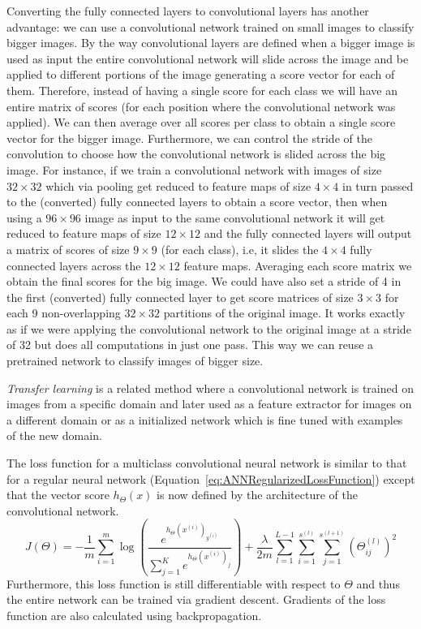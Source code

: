 Converting the fully connected layers to convolutional layers has another advantage: we can use a convolutional network trained on small images to classify bigger images. By the way convolutional layers are defined when a bigger image is used as input the entire convolutional network will slide across the image and be applied to different portions of the image generating a score vector for each of them. Therefore, instead of having a single score for each class we will have an entire matrix of scores (for each position where the convolutional network was applied). We can then average over all scores per class to obtain a single score vector for the bigger image. Furthermore, we can control the stride of the convolution to choose how the convolutional network is slided across the big image.
For instance, if we train a convolutional network with images of size $32\times 32$ which via pooling get reduced to feature maps of size $4\times 4$ in turn passed to the (converted) fully connected layers to obtain a score vector, then when using a $96\times 96$ image as input to the same convolutional network it will get reduced to feature maps of size $12 \times 12$ and the fully connected layers will output a matrix of scores of size $9\times 9$ (for each class), i.e, it slides the $4\times 4$ fully connected layers across the $12\times 12$ feature maps. Averaging each score matrix we obtain the final scores for the big image. We could have also  set a stride of 4 in the first (converted) fully connected layer to get score matrices of size $3\times 3$ for each 9 non-overlapping $32\times 32$ partitions of the original image. It works exactly as if we were applying the convolutional network to the original image at a stride of 32 but does all computations in just one pass. This way we can reuse a pretrained network to classify images of bigger size. 

\emph{Transfer learning} is a related method where a convolutional network is trained on images from a specific domain and later used as a feature extractor for images on a different domain or as a initialized network which is fine tuned with examples of the new domain.

The loss function for a multiclass convolutional neural network is similar to that for a regular neural network (Equation~\ref{eq:ANNRegularizedLossFunction}) except that the vector score $h_\Theta(x)$ is now defined by the architecture of the convolutional network.
\begin{equation}
	J(\Theta) = -\frac{1}{m} \sum_{i=1}^m \log \left ( \frac{ e^{h_\Theta(x^{(i)})_{y^{(i)}}} }{ \sum_{j=1}^K e^{ h_\Theta (x^{(i)})_j} } \right ) + \frac{\lambda}{2m}\sum_{l=1}^{L-1}\sum_{i=1}^{s^{(l)}}\sum_{j=1}^{s^{(l+1)}} \left(\Theta^{(l)}_{ij}\right)^2
	\label{eq:ConvNetLossFunction}
\end{equation}
Furthermore, this loss function is still differentiable with respect to $\Theta$ and thus the entire network can be trained via gradient descent. Gradients of the loss function are also calculated using backpropagation.
